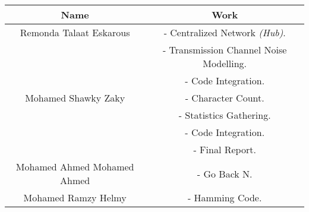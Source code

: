 \begin{center}
\begin{tabular}{||c |c ||} 
 \hline
 Name & Work \\ [0.5ex] 
 \hline\hline
 Remonda Talaat Eskarous & - Centralized Network \emph{(Hub)}. \\
  & - Transmission Channel Noise Modelling. \\
  & - Code Integration.  \\
  \hline
 Mohamed Shawky Zaky & - Character Count. \\
  & - Statistics Gathering. \\
  & - Code Integration.  \\
  & - Final Report.  \\
 \hline
 Mohamed Ahmed Mohamed Ahmed & - Go Back N. \\
 \hline
 Mohamed Ramzy Helmy &  - Hamming Code. \\ [1ex] 
 \hline
\end{tabular}
\end{center}